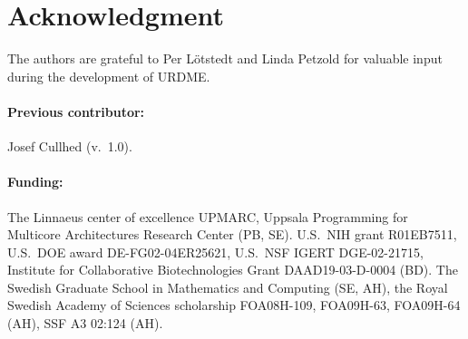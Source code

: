 \section*{Acknowledgment}

The authors are grateful to Per L{\"o}tstedt and Linda Petzold for
valuable input during the development of URDME.

\paragraph{Previous contributor:} Josef Cullhed (v.~1.0).

\paragraph{Funding:} 

The Linnaeus center of excellence UPMARC, Uppsala Programming for
Multicore Architectures Research Center (PB, SE). U.S.~NIH grant
R01EB7511, U.S.~DOE award DE-FG02-04ER25621, U.S.~NSF IGERT
DGE-02-21715, Institute for Collaborative Biotechnologies Grant
DAAD19-03-D-0004 (BD). The Swedish Graduate School in Mathematics and
Computing (SE, AH), the Royal Swedish Academy of Sciences scholarship
FOA08H-109, FOA09H-63, FOA09H-64 (AH), SSF A3 02:124 (AH).
